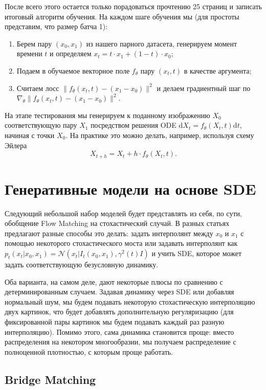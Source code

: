 \documentclass[12pt]{article}
\theoremstyle{definition}
\begin{document}
После всего этого остается только порадоваться прочтению 25 страниц и записать итоговый алгоритм обучения. На каждом шаге обучения мы (для простоты представим, что размер батча 1):
\begin{enumerate}
    \item Берем пару $(x_0, x_1)$ из нашего парного датасета, генерируем момент времени $t$ и определяем $x_t = t \cdot x_1 + (1 - t) \cdot x_0$;
    \item Подаем в обучаемое векторное поле $f_\theta$ пару $(x_t, t)$ в качестве аргумента;
    \item Считаем лосс $\|f_\theta(x_t, t) - (x_1 - x_0) \|^2$ и делаем градиентный шаг по $\nabla_\theta\|f_\theta(x_t, t) - (x_1 - x_0) \|^2$.
\end{enumerate}

На этапе тестирования мы генерируем к поданному изображению $X_0$ соответствующую пару $X_1$ посредством решения ODE $\mathrm{d} X_t = f_\theta(X_t, t) \mathrm{d} t$, начиная с точки $X_0$. На практике это можно делать, например, используя схему Эйлера
\[
    X_{t + h} = X_t + h \cdot f_\theta(X_t, t).
\]

\section{Генеративные модели на основе SDE}
Следующий небольшой набор моделей будет представлять из себя, по сути, обобщение Flow Matching на стохастический случай. В разных статьях предлагают разные способы это делать: задать интерполянт между $x_0$ и $x_1$ с помощью некоторого стохастического моста или задавать интерполянт как $p_t(x_t | x_0, x_1) = \mathcal{N}(x_t | I_t(x_0, x_1), \gamma^2(t) I)$ и учить SDE, которое может задать соответствующую безусловную динамику.

Оба варианта, на самом деле, дают некоторые плюсы по сравнению с детерминированным случаем. Задавая динамику через SDE или добавляя нормальный шум, мы будем подавать некоторую стохастическую интерполяцию двух картинок, что будет добавлять дополнительную регуляризацию (для фиксированной пары картинок мы будем подавать каждый раз разную интерполяцию). Помимо этого, сама динамика становится проще: вместо распределения на некотором многообразии, мы получаем распределение с полноценной плотностью, с которым проще работать.

\subsection{Bridge Matching}
\end{document}

